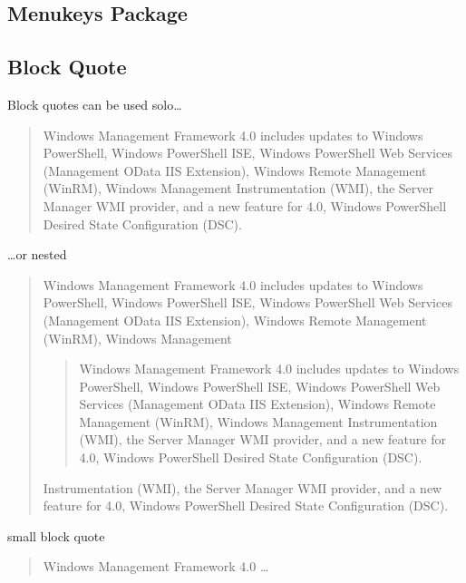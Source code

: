 \documentclass{uibk}
\begin{document}
\subsection{Menukeys Package}
\label{sub:menukeys_package}




\subsection{Block Quote}
\label{sub:block_quote}

Block quotes can be used solo\dots

\begin{quote}
    Windows Management Framework 4.0 includes updates to Windows PowerShell,
    Windows PowerShell ISE, Windows PowerShell Web Services (Management OData
    IIS Extension), Windows Remote Management (WinRM), Windows Management
    Instrumentation (WMI), the Server Manager WMI provider, and a new feature
    for 4.0, Windows PowerShell Desired State Configuration (DSC).
\end{quote}

\dots or nested

\begin{quote}
    Windows Management Framework 4.0 includes updates to Windows PowerShell,
    Windows PowerShell ISE, Windows PowerShell Web Services (Management OData
    IIS Extension), Windows Remote Management (WinRM), Windows Management

    \begin{quote}
        Windows Management Framework 4.0 includes updates to Windows PowerShell,
        Windows PowerShell ISE, Windows PowerShell Web Services (Management OData
        IIS Extension), Windows Remote Management (WinRM), Windows Management
        Instrumentation (WMI), the Server Manager WMI provider, and a new feature
        for 4.0, Windows PowerShell Desired State Configuration (DSC).
    \end{quote}

    Instrumentation (WMI), the Server Manager WMI provider, and a new feature
    for 4.0, Windows PowerShell Desired State Configuration (DSC).
\end{quote}

small block quote

\begin{quote}
    Windows Management Framework 4.0 \dots
\end{quote}
\end{document}
